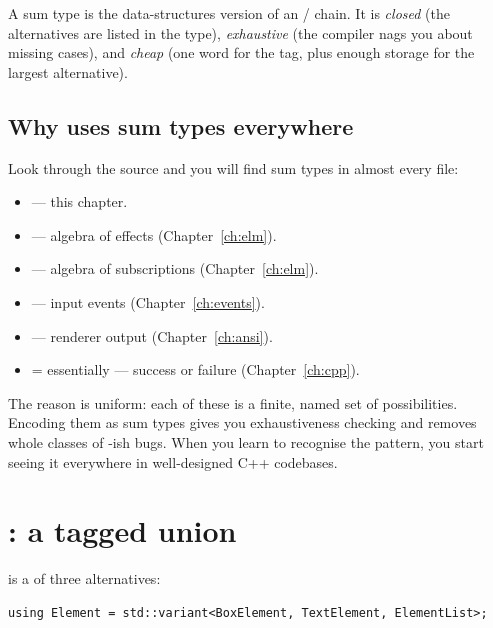 \begin{idea}
A sum type is the data-structures version of an /
chain. It is \emph{closed} (the alternatives are listed in the
type), \emph{exhaustive} (the compiler nags you about missing
cases), and \emph{cheap} (one word for the tag, plus enough storage
for the largest alternative).
\end{idea}

\subsection{Why \maya{} uses sum types everywhere}

Look through the source and you will find sum types in almost every
file:

\begin{itemize}[leftmargin=*]
  \item {}
    --- this chapter.
  \item {} --- algebra of effects
    (Chapter~\ref{ch:elm}).
  \item {} --- algebra of subscriptions
    (Chapter~\ref{ch:elm}).
  \item {}
    --- input events (Chapter~\ref{ch:events}).
  \item {}
    --- renderer output (Chapter~\ref{ch:ansi}).
  \item {} =  essentially ---
    success or failure (Chapter~\ref{ch:cpp}).
\end{itemize}

The reason is uniform: each of these is a finite, named set of
possibilities. Encoding them as sum types gives you exhaustiveness
checking and removes whole classes of -ish bugs. When
you learn to recognise the pattern, you start seeing it everywhere
in well-designed C++ codebases.

\section{: a tagged union}

 is a  of three alternatives:

\begin{lstlisting}
using Element = std::variant<BoxElement, TextElement, ElementList>;
\end{lstlisting}

